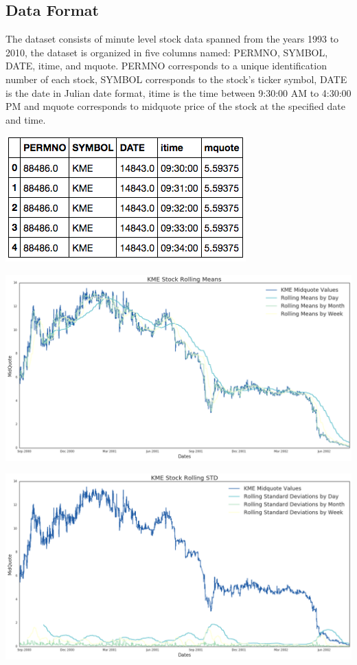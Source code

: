 \subsection{Data Format}\label{sec:data}
The dataset consists of minute level stock data spanned from the years 1993 to 2010, the dataset is organized in five columns named: PERMNO, SYMBOL, DATE, itime, and mquote. PERMNO corresponds to a unique identification number of each stock, SYMBOL corresponds to the stock's ticker symbol, DATE is the date in Julian date format, itime is the time between 9:30:00 AM to 4:30:00 PM and mquote corresponds to midquote price of the stock at the specified date and time. 

\includegraphics[width=\columnwidth]{datatable}

\includegraphics[width=\columnwidth]{RollingM}

\includegraphics[width=\columnwidth]{RollingS}
